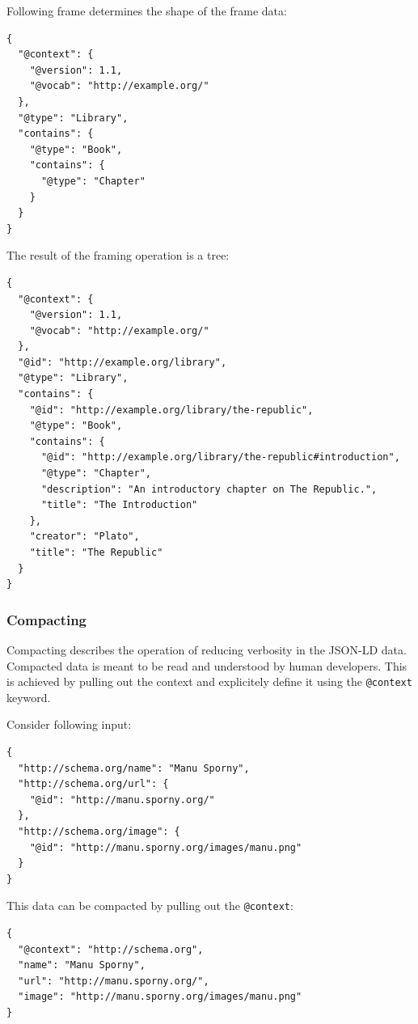 Following frame determines the shape of the frame data:

\lstset{language=JSON}
\begin{lstlisting}[caption=Frame for the framing operation]
{
  "@context": {
    "@version": 1.1,
    "@vocab": "http://example.org/"
  },
  "@type": "Library",
  "contains": {
    "@type": "Book",
    "contains": {
      "@type": "Chapter"
    }
  }
}
\end{lstlisting}

The result of the framing operation is a tree:

\lstset{language=JSON}
\begin{lstlisting}[caption=Framed data of a library]
{
  "@context": {
    "@version": 1.1,
    "@vocab": "http://example.org/"
  },
  "@id": "http://example.org/library",
  "@type": "Library",
  "contains": {
    "@id": "http://example.org/library/the-republic",
    "@type": "Book",
    "contains": {
      "@id": "http://example.org/library/the-republic#introduction",
      "@type": "Chapter",
      "description": "An introductory chapter on The Republic.",
      "title": "The Introduction"
    },
    "creator": "Plato",
    "title": "The Republic"
  }
}
\end{lstlisting}

\subsubsection{Compacting}\label{jsonldcompacting}

Compacting describes the operation of reducing verbosity in the JSON-LD data. Compacted data is meant to be read and understood by human developers. This is achieved by pulling out the context and explicitely define it using the \lstinline{@context} keyword.

Consider following input:

\lstset{language=JSON}
\begin{lstlisting}[caption=Verbose data of a person]
{
  "http://schema.org/name": "Manu Sporny",
  "http://schema.org/url": {
    "@id": "http://manu.sporny.org/"
  },
  "http://schema.org/image": {
    "@id": "http://manu.sporny.org/images/manu.png"
  }
}
\end{lstlisting}

This data can be compacted by pulling out the \lstinline{@context}:

\lstset{language=JSON}
\begin{lstlisting}[caption=Compacted and easy-to-read data of a person]
{
  "@context": "http://schema.org",
  "name": "Manu Sporny",
  "url": "http://manu.sporny.org/",
  "image": "http://manu.sporny.org/images/manu.png"
}
\end{lstlisting}

